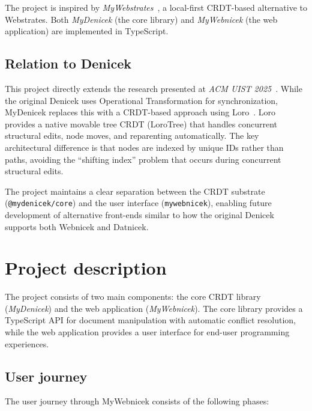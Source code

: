 \documentclass{article}
\begin{document}
The project is inspired by \emph{MyWebstrates}~\cite{klokmose2024}, a local-first CRDT-based alternative to Webstrates. Both \emph{MyDenicek} (the core library) and \emph{MyWebnicek} (the web application) are implemented in TypeScript.

\subsection{Relation to Denicek}

This project directly extends the research presented at \emph{ACM UIST 2025}~\cite{denicek2024}. While the original Denicek uses Operational Transformation for synchronization, MyDenicek replaces this with a CRDT-based approach using Loro~\cite{loro}. Loro provides a native movable tree CRDT (LoroTree) that handles concurrent structural edits, node moves, and reparenting automatically. The key architectural difference is that nodes are indexed by unique IDs rather than paths, avoiding the ``shifting index'' problem that occurs during concurrent structural edits.

The project maintains a clear separation between the CRDT substrate (\texttt{@mydenicek/core}) and the user interface (\texttt{mywebnicek}), enabling future development of alternative front-ends similar to how the original Denicek supports both Webnicek and Datnicek.


\section{Project description}

The project consists of two main components: the core CRDT library (\emph{MyDenicek}) and the web application (\emph{MyWebnicek}). The core library provides a TypeScript API for document manipulation with automatic conflict resolution, while the web application provides a user interface for end-user programming experiences.

\subsection{User journey}

The user journey through MyWebnicek consists of the following phases:
\end{document}
